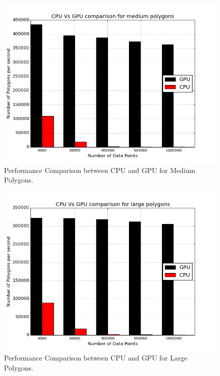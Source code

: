 \begin{figure}[H]
\centering
\vspace{0.5in}
\includegraphics[scale=0.5]{Images/CPU_GPU_MediumPoly3}
\vspace{0.5in}
\caption{Performance Comparison between CPU and GPU for Medium Polygons.}
\label{fig:CPU_GPU_MediumPoly3}
\end{figure}

\begin{figure}[H]
\centering
\vspace{0.5in}
\includegraphics[scale=0.5]{Images/CPU_GPU_LargePoly3}
\vspace{0.5in}
\caption{Performance Comparison between CPU and GPU for Large Polygons.}
\label{fig:CPU_GPU_LargePoly3}
\end{figure}

